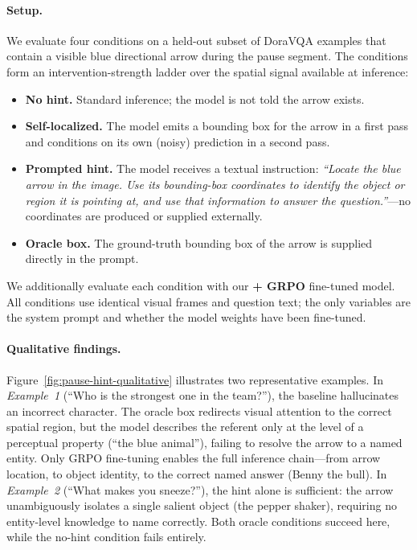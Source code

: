 \documentclass{article}
\begin{document}
\paragraph{Setup.}
We evaluate four conditions on a held-out subset of DoraVQA examples that contain
a visible blue directional arrow during the pause segment. The conditions form an
intervention-strength ladder over the spatial signal available at inference:
\begin{itemize}
    \item \textbf{No hint.} Standard inference; the model is not told the arrow exists.
    \item \textbf{Self-localized.} The model emits a bounding box for the arrow in a
    first pass and conditions on its own (noisy) prediction in a second pass.
    \item \textbf{Prompted hint.} The model receives a textual instruction:
    \textit{``Locate the blue arrow in the image. Use its bounding-box coordinates to
    identify the object or region it is pointing at, and use that information to answer
    the question.''}---no coordinates are produced or supplied externally.
    \item \textbf{Oracle box.} The ground-truth bounding box of the arrow is supplied
    directly in the prompt.
\end{itemize}
We additionally evaluate each condition with our \textbf{+ GRPO} fine-tuned model.
All conditions use identical visual frames and question text; the only variables are the
system prompt and whether the model weights have been fine-tuned.

\paragraph{Qualitative findings.}
Figure~\ref{fig:pause-hint-qualitative} illustrates two representative examples.
In \textit{Example~1} (``Who is the strongest one in the team?''), the baseline
hallucinates an incorrect character.
The oracle box redirects visual attention to the correct spatial region, but the model
describes the referent only at the level of a perceptual property (``the blue animal''),
failing to resolve the arrow to a named entity.
Only GRPO fine-tuning enables the full inference chain---from arrow location, to object
identity, to the correct named answer (Benny the bull).
In \textit{Example~2} (``What makes you sneeze?''), the hint alone is sufficient: the
arrow unambiguously isolates a single salient object (the pepper shaker), requiring no
entity-level knowledge to name correctly.
Both oracle conditions succeed here, while the no-hint condition fails entirely.
\end{document}
